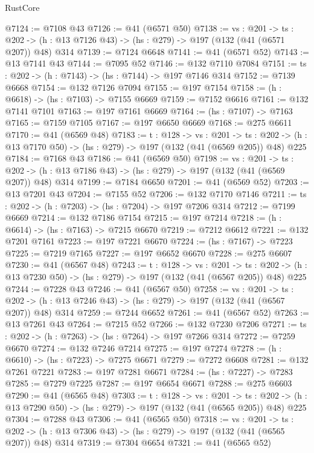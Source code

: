 \begin{lexlean}{RustCore}
\begin{coremodule}
@7124 := @7108 @43
@7126 := @41 (@6571 @50)
@7138 := {vs : @201} ->
  {ts : @202} -> (h : @13 @7126 @43) -> (hs : @279) -> @197 (@132 (@41 (@6571 @207)) @48) @314
@7139 := @7124 @6648
@7141 := @41 (@6571 @52)
@7143 := @13 @7141 @43
@7144 := @7095 @52
@7146 := @132 @7110 @7084
@7151 := {ts : @202} -> (h : @7143) -> (hs : @7144) -> @197 @7146 @314
@7152 := @7139 @6668
@7154 := @132 @7126 @7094
@7155 := @197 @7154
@7158 := (h : @6618) -> (hs : @7103) -> @7155 @6669
@7159 := @7152 @6616
@7161 := @132 @7141 @7101
@7163 := @197 @7161 @6669
@7164 := (hs : @7107) -> @7163
@7165 := @7159 @7105
@7167 := @197 @6650 @6669
@7168 := @275 @6611
@7170 := @41 (@6569 @48)
@7183 := {t : @128} ->
  {vs : @201} ->
  {ts : @202} -> (h : @13 @7170 @50) -> (hs : @279) -> @197 (@132 (@41 (@6569 @205)) @48) @225
@7184 := @7168 @43
@7186 := @41 (@6569 @50)
@7198 := {vs : @201} ->
  {ts : @202} -> (h : @13 @7186 @43) -> (hs : @279) -> @197 (@132 (@41 (@6569 @207)) @48) @314
@7199 := @7184 @6650
@7201 := @41 (@6569 @52)
@7203 := @13 @7201 @43
@7204 := @7155 @52
@7206 := @132 @7170 @7146
@7211 := {ts : @202} -> (h : @7203) -> (hs : @7204) -> @197 @7206 @314
@7212 := @7199 @6669
@7214 := @132 @7186 @7154
@7215 := @197 @7214
@7218 := (h : @6614) -> (hs : @7163) -> @7215 @6670
@7219 := @7212 @6612
@7221 := @132 @7201 @7161
@7223 := @197 @7221 @6670
@7224 := (hs : @7167) -> @7223
@7225 := @7219 @7165
@7227 := @197 @6652 @6670
@7228 := @275 @6607
@7230 := @41 (@6567 @48)
@7243 := {t : @128} ->
  {vs : @201} ->
  {ts : @202} -> (h : @13 @7230 @50) -> (hs : @279) -> @197 (@132 (@41 (@6567 @205)) @48) @225
@7244 := @7228 @43
@7246 := @41 (@6567 @50)
@7258 := {vs : @201} ->
  {ts : @202} -> (h : @13 @7246 @43) -> (hs : @279) -> @197 (@132 (@41 (@6567 @207)) @48) @314
@7259 := @7244 @6652
@7261 := @41 (@6567 @52)
@7263 := @13 @7261 @43
@7264 := @7215 @52
@7266 := @132 @7230 @7206
@7271 := {ts : @202} -> (h : @7263) -> (hs : @7264) -> @197 @7266 @314
@7272 := @7259 @6670
@7274 := @132 @7246 @7214
@7275 := @197 @7274
@7278 := (h : @6610) -> (hs : @7223) -> @7275 @6671
@7279 := @7272 @6608
@7281 := @132 @7261 @7221
@7283 := @197 @7281 @6671
@7284 := (hs : @7227) -> @7283
@7285 := @7279 @7225
@7287 := @197 @6654 @6671
@7288 := @275 @6603
@7290 := @41 (@6565 @48)
@7303 := {t : @128} ->
  {vs : @201} ->
  {ts : @202} -> (h : @13 @7290 @50) -> (hs : @279) -> @197 (@132 (@41 (@6565 @205)) @48) @225
@7304 := @7288 @43
@7306 := @41 (@6565 @50)
@7318 := {vs : @201} ->
  {ts : @202} -> (h : @13 @7306 @43) -> (hs : @279) -> @197 (@132 (@41 (@6565 @207)) @48) @314
@7319 := @7304 @6654
@7321 := @41 (@6565 @52)

\end{coremodule}
\end{lexlean}
